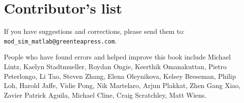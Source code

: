 \documentclass[main.tex]{subfiles}
\begin{document}
\newpage

\section*{Contributor's list}

If you have suggestions and corrections, please send them to:\\
\verb"mod_sim_matlab@greenteapress.com".


People who have found errors and helped improve this book include
Michael Lintz, 
Kaelyn Stadtmueller, 
Roydan Ongie, 
Keerthik Omanakuttan, 
Pietro Peterlongo, 
Li Tao, 
Steven Zhang, 
Elena Oleynikova, 
Kelsey Breseman, 
Philip Loh, 
Harold Jaffe, 
Vidie Pong, 
Nik Martelaro, 
Arjun Plakkat, 
Zhen Gang Xiao, 
Zavier Patrick Aguila, 
Michael Cline,
Craig Scratchley,
Matt Wiens.

\newpage
\end{document}
